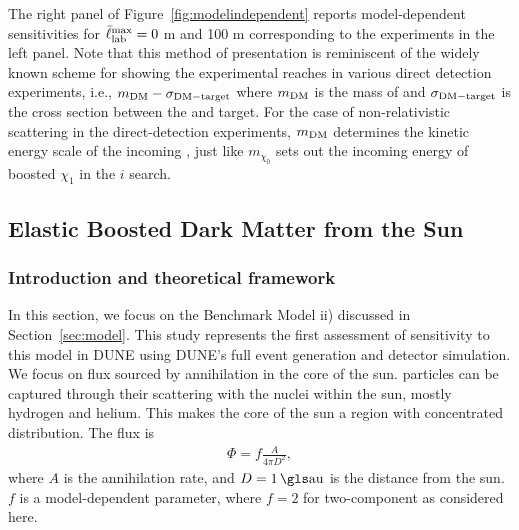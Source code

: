 The right panel of Figure~\ref{fig:modelindependent} reports model-dependent sensitivities for $\bar{\ell}_{\rm lab}^{\rm max} = 0$ m and 100 m corresponding to the experiments in the left panel.
Note that this %
method of presentation is reminiscent of the widely known scheme for showing the experimental reaches in various  direct detection experiments, i.e., $m_{\rm DM} - \sigma_{\rm DM - target}$ where $m_{\rm DM}$ is the mass of  and $\sigma_{\rm DM - target}$ is the cross section between the  and target. 
For the case of non-relativistic  scattering in the direct-detection experiments, $m_{\rm DM}$ determines the kinetic energy scale of the incoming , just like $m_{\chi_0}$ sets out the incoming energy of boosted $\chi_1$ in the $i$ search. 

\subsection{Elastic Boosted Dark Matter from the Sun \label{sec:FDsun}}

\subsubsection{\label{sec:level2} Introduction and theoretical framework}


In this section, we focus on the Benchmark Model ii) discussed in Section~\ref{sec:model}. This study represents the first assessment of sensitivity to this model in DUNE using DUNE's full event generation and detector simulation. We focus on  flux sourced by  annihilation in the core of the sun.  particles can be captured through their scattering with the nuclei within the sun, mostly hydrogen and helium. This makes the core of the sun a region with concentrated  distribution. The  flux is
\begin{eqnarray} \label{eq:fluxbdm}
\Phi= f \frac{A}{4\pi D^2},
\end{eqnarray}
where $A$ is the annihilation rate, and $D = 1\,\rm{\dword{au}}$ is the distance from the sun. $f$ is a model-dependent parameter, where $f = 2$ for two-component  as considered here.

